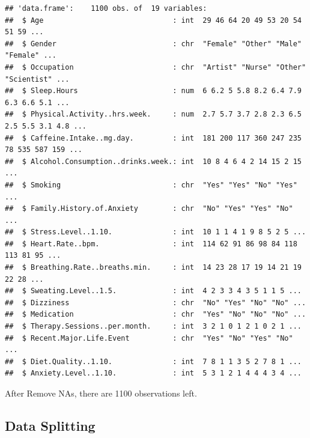 \documentclass[
]{article}
\newenvironment{Shaded}{\begin{snugshade}}{\end{snugshade}}
\newcommand{\AttributeTok}[1]{\textcolor[rgb]{0.13,0.29,0.53}{#1}}
\newcommand{\ConstantTok}[1]{\textcolor[rgb]{0.56,0.35,0.01}{#1}}
\newcommand{\DecValTok}[1]{\textcolor[rgb]{0.00,0.00,0.81}{#1}}
\newcommand{\FloatTok}[1]{\textcolor[rgb]{0.00,0.00,0.81}{#1}}
\newcommand{\FunctionTok}[1]{\textcolor[rgb]{0.13,0.29,0.53}{\textbf{#1}}}
\newcommand{\NormalTok}[1]{#1}
\newcommand{\OtherTok}[1]{\textcolor[rgb]{0.56,0.35,0.01}{#1}}
\newcommand{\SpecialCharTok}[1]{\textcolor[rgb]{0.81,0.36,0.00}{\textbf{#1}}}
\begin{document}
\begin{verbatim}
## 'data.frame':    1100 obs. of  19 variables:
##  $ Age                              : int  29 46 64 20 49 53 20 54 51 59 ...
##  $ Gender                           : chr  "Female" "Other" "Male" "Female" ...
##  $ Occupation                       : chr  "Artist" "Nurse" "Other" "Scientist" ...
##  $ Sleep.Hours                      : num  6 6.2 5 5.8 8.2 6.4 7.9 6.3 6.6 5.1 ...
##  $ Physical.Activity..hrs.week.     : num  2.7 5.7 3.7 2.8 2.3 6.5 2.5 5.5 3.1 4.8 ...
##  $ Caffeine.Intake..mg.day.         : int  181 200 117 360 247 235 78 535 587 159 ...
##  $ Alcohol.Consumption..drinks.week.: int  10 8 4 6 4 2 14 15 2 15 ...
##  $ Smoking                          : chr  "Yes" "Yes" "No" "Yes" ...
##  $ Family.History.of.Anxiety        : chr  "No" "Yes" "Yes" "No" ...
##  $ Stress.Level..1.10.              : int  10 1 1 4 1 9 8 5 2 5 ...
##  $ Heart.Rate..bpm.                 : int  114 62 91 86 98 84 118 113 81 95 ...
##  $ Breathing.Rate..breaths.min.     : int  14 23 28 17 19 14 21 19 22 28 ...
##  $ Sweating.Level..1.5.             : int  4 2 3 3 4 3 5 1 1 5 ...
##  $ Dizziness                        : chr  "No" "Yes" "No" "No" ...
##  $ Medication                       : chr  "Yes" "No" "No" "No" ...
##  $ Therapy.Sessions..per.month.     : int  3 2 1 0 1 2 1 0 2 1 ...
##  $ Recent.Major.Life.Event          : chr  "Yes" "No" "Yes" "No" ...
##  $ Diet.Quality..1.10.              : int  7 8 1 1 3 5 2 7 8 1 ...
##  $ Anxiety.Level..1.10.             : int  5 3 1 2 1 4 4 4 3 4 ...
\end{verbatim}

After Remove NAs, there are 1100 observations left.

\subsection{Data Splitting}\label{data-splitting}

\begin{Shaded}
\end{Shaded}
\end{document}
